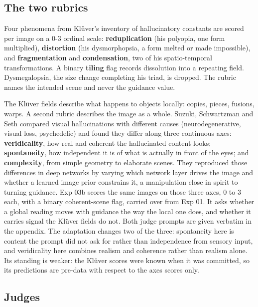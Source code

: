\documentclass[11pt]{article}
\begin{document}
\subsection{The two rubrics}\label{the-two-rubrics}

Four phenomena from Klüver's inventory of hallucinatory constants
\citep[pp.~175-207]{kluver1966} are scored per image on a 0-3 ordinal scale:
\textbf{reduplication} (his polyopia, one form multiplied), \textbf{distortion}
(his dysmorphopsia, a form melted or made impossible), and
\textbf{fragmentation} and \textbf{condensation}, two of his spatio-temporal
transformations. A binary \textbf{tiling} flag records dissolution into a
repeating field. Dysmegalopsia, the size change completing his triad, is
dropped. The rubric names the intended scene and never the guidance value.

The Klüver fields describe what happens to objects locally: copies, pieces,
fusions, warps. A second rubric describes the image as a whole. Suzuki,
Schwartzman and Seth \citep{suzuki2024} compared visual hallucinations with
different causes (neurodegenerative, visual loss, psychedelic) and found they
differ along three continuous axes: \textbf{veridicality}, how real and coherent
the hallucinated content looks; \textbf{spontaneity}, how independent it is of
what is actually in front of the eyes; and \textbf{complexity}, from simple
geometry to elaborate scenes. They reproduced those differences in deep networks
by varying which network layer drives the image and whether a learned image
prior constrains it, a manipulation close in spirit to turning guidance. Exp 03b
scores the same images on those three axes, 0 to 3 each, with a binary
coherent-scene flag, carried over from Exp 01. It asks whether a global reading
moves with guidance the way the local one does, and whether it carries signal
the Klüver fields do not. Both judge prompts are given verbatim in the appendix.
The adaptation changes two of the three: spontaneity here is content the prompt
did not ask for rather than independence from sensory input, and veridicality
here combines realism and coherence rather than realism alone. Its standing is
weaker: the Klüver scores were known when it was committed, so its predictions
are pre-data with respect to the axes scores only.

\subsection{Judges}\label{judges}
\end{document}
